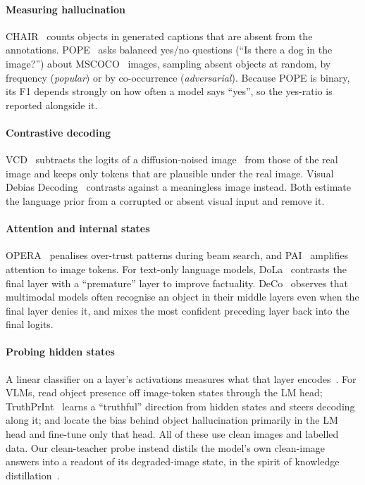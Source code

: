 \documentclass[10pt,a4paper]{article}
\begin{document}
\paragraph{Measuring hallucination} CHAIR~\citep{rohrbach2018chair} counts objects in generated captions that are absent from the annotations. POPE~\citep{li2023pope} asks balanced yes/no questions (``Is there a dog in the image?'') about MSCOCO~\citep{lin2014coco} images, sampling absent objects at random, by frequency (\emph{popular}) or by co-occurrence (\emph{adversarial}). Because POPE is binary, its F1 depends strongly on how often a model says ``yes'', so the yes-ratio is reported alongside it.

\paragraph{Contrastive decoding} VCD~\citep{leng2024vcd} subtracts the logits of a diffusion-noised image~\citep{ho2020ddpm} from those of the real image and keeps only tokens that are plausible under the real image. Visual Debias Decoding~\citep{zhang2024debias} contrasts against a meaningless image instead. Both estimate the language prior from a corrupted or absent visual input and remove it.

\paragraph{Attention and internal states} OPERA~\citep{huang2024opera} penalises over-trust patterns during beam search, and PAI~\citep{liu2024pai} amplifies attention to image tokens. For text-only language models, DoLa~\citep{chuang2024dola} contrasts the final layer with a ``premature'' layer to improve factuality. DeCo~\citep{wang2025deco} observes that multimodal models often recognise an object in their middle layers even when the final layer denies it, and mixes the most confident preceding layer back into the final logits.

\paragraph{Probing hidden states} A linear classifier on a layer's activations measures what that layer encodes~\citep{alain2016probes}. For VLMs, \citet{jiang2025interpreting} read object presence off image-token states through the LM head; TruthPrInt~\citep{duan2025truthprint} learns a ``truthful'' direction from hidden states and steers decoding along it; and \citet{li2025trainingbias} locate the bias behind object hallucination primarily in the LM head and fine-tune only that head. All of these use clean images and labelled data. Our clean-teacher probe instead distils the model's own clean-image answers into a readout of its degraded-image state, in the spirit of knowledge distillation~\citep{hinton2015distilling}.
\end{document}
